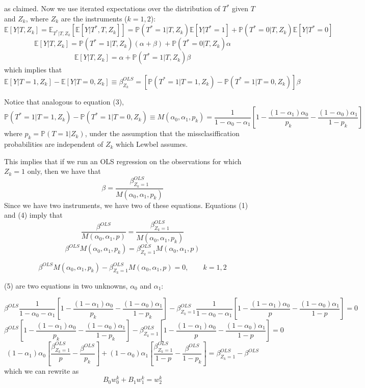 as claimed.
Now we use iterated expectations over the distribution of $T^{*}$
given $T$ and $Z_{k}$, where $Z_{k}$ are the instruments ($k=1,2$):
\[
\mathbb{E}[Y|T,Z_{k}]=\mathbb{E}_{T^{*}|T,Z_{k}}\left[\mathbb{E}[Y|T^{*},T,Z_{k}]\right]=\mathbb{P}(T^{*}=1|T,Z_{k})\mathbb{E}[Y|T^{*}=1]+\mathbb{P}(T^{*}=0|T,Z_{k})\mathbb{E}[Y|T^{*}=0]
\]
\[
\mathbb{E}[Y|T,Z_{k}]=\mathbb{P}(T^{*}=1|T,Z_{k})(\alpha+\beta)+\mathbb{P}(T^{*}=0|T,Z_{k})\alpha
\]
\[
\mathbb{E}[Y|T,Z_{k}]=\alpha+\mathbb{P}(T^{*}=1|T,Z_{k})\beta
\]
which implies that
\[
\mathbb{E}[Y|T=1,Z_{k}]-\mathbb{E}[Y|T=0,Z_{k}]\equiv\beta_{Z_{k}}^{OLS}=\left[\mathbb{P}(T^{*}=1|T=1,Z_{k})-\mathbb{P}(T^{*}=1|T=0,Z_{k})\right]\beta
\]


Notice that analogous to equation (3), 
\[
\mathbb{P}(T^{*}=1|T=1,Z_{k})-\mathbb{P}(T^{*}=1|T=0,Z_{k})\equiv M(\alpha_{0},\alpha_{1},p_{k})=\frac{1}{1-\alpha_{0}-\alpha_{1}}\left[1-\frac{(1-\alpha_{1})\alpha_{0}}{p_{k}}-\frac{(1-\alpha_{0})\alpha_{1}}{1-p_{k}}\right]
\]
where $p_{k}=\mathbb{P}(T=1|Z_{k})$, under the assumption that the
missclasiffication probabilities are independent of $Z_{k}$ which
Lewbel assumes.

This implies that if we run an OLS regression on the observations
for which $Z_{k}=1$ only, then we have that 
\begin{equation}
\beta=\frac{\beta_{Z_{k}=1}^{OLS}}{M(\alpha_{0},\alpha_{1},p_{k})}
\end{equation}
Since we have two instruments, we have two of these equations. Equations
(1) and (4) imply that 
\[
\frac{\beta^{OLS}}{M(\alpha_{0},\alpha_{1},p)}=\frac{\beta_{Z_{k}=1}^{OLS}}{M(\alpha_{0},\alpha_{1},p_{k})}
\]
\[
\beta^{OLS}M(\alpha_{0},\alpha_{1},p_{k})=\beta_{Z_{k}=1}^{OLS}M(\alpha_{0},\alpha_{1},p)
\]


\begin{equation}
\beta^{OLS}M(\alpha_{0},\alpha_{1},p_{k})-\beta_{Z_{k}=1}^{OLS}M(\alpha_{0},\alpha_{1},p)=0,\qquad k=1,2
\end{equation}


(5) are two equations in two unknowns, $\alpha_{0}$ and $\alpha_{1}$:

\[
\beta^{OLS}\frac{1}{1-\alpha_{0}-\alpha_{1}}\left[1-\frac{(1-\alpha_{1})\alpha_{0}}{p_{k}}-\frac{(1-\alpha_{0})\alpha_{1}}{1-p_{k}}\right]-\beta_{Z_{k}=1}^{OLS}\frac{1}{1-\alpha_{0}-\alpha_{1}}\left[1-\frac{(1-\alpha_{1})\alpha_{0}}{p}-\frac{(1-\alpha_{0})\alpha_{1}}{1-p}\right]=0
\]
\[
\beta^{OLS}\left[1-\frac{(1-\alpha_{1})\alpha_{0}}{p_{k}}-\frac{(1-\alpha_{0})\alpha_{1}}{1-p_{k}}\right]-\beta_{Z_{k}=1}^{OLS}\left[1-\frac{(1-\alpha_{1})\alpha_{0}}{p}-\frac{(1-\alpha_{0})\alpha_{1}}{1-p}\right]=0
\]
\[
(1-\alpha_{1})\alpha_{0}\left[\frac{\beta_{Z_{k}=1}^{OLS}}{p}-\frac{\beta^{OLS}}{p_{k}}\right]+(1-\alpha_{0})\alpha_{1}\left[\frac{\beta_{Z_{k}=1}^{OLS}}{1-p}-\frac{\beta^{OLS}}{1-p_{k}}\right]=\beta_{Z_{k}=1}^{OLS}-\beta^{OLS}
\]
which we can rewrite as 
\[
B_{0}w_{0}^{k}+B_{1}w_{1}^{k}=w_{2}^{k}
\]



